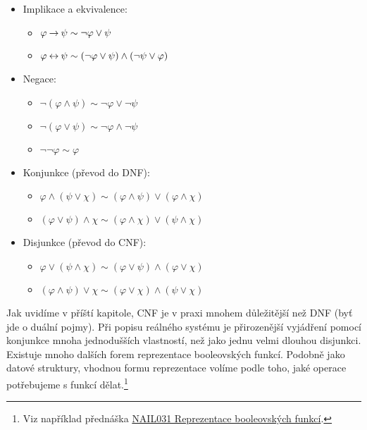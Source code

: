 \begin{tcolorbox}
\begin{multicols}{2}
\begin{itemize}
    \item Implikace a ekvivalence:
    \begin{itemize}
        \item[] $\varphi\mathbin{\rightarrow}\psi\sim\neg\varphi\lor\psi$
        \item[] $\varphi\mathbin{\leftrightarrow}\psi\sim(\neg\varphi\lor\psi)\land(\neg\psi\lor\varphi)$
    \end{itemize}
    \item Negace:
    \begin{itemize}
        \item[] $\neg(\varphi\land\psi)\sim\neg\varphi\lor\neg\psi$
        \item[] $\neg(\varphi\lor\psi)\sim\neg\varphi\land\neg\psi$
        \item[] $\neg\neg\varphi\sim\varphi$
    \end{itemize}
    \item Konjunkce (převod do DNF):
    \begin{itemize}
        \item[] $\varphi \land (\psi\lor\chi) \sim (\varphi\land\psi)\lor (\varphi\land\chi)$
        \item[] $(\varphi \lor \psi)\land\chi \sim (\varphi\land\chi)\lor (\psi\land\chi)$
    \end{itemize}
    \item Disjunkce (převod do CNF):
    \begin{itemize}
        \item[] $\varphi \lor (\psi\land\chi) \sim (\varphi\lor\psi)\land (\varphi\lor\chi)$
        \item[] $(\varphi \land \psi)\lor\chi \sim (\varphi\lor\chi)\land (\psi\lor\chi)$
    \end{itemize}
\end{itemize}
\end{multicols}
\end{tcolorbox}


Jak uvidíme v příští kapitole, CNF je v praxi mnohem důležitější než DNF (byť jde o duální pojmy). Při popisu reálného systému je přirozenější vyjádření pomocí konjunkce mnoha jednodušších vlastností, než jako jednu velmi dlouhou disjunkci. Existuje mnoho dalších forem reprezentace booleovských funkcí. Podobně jako datové struktury, vhodnou formu reprezentace volíme podle toho, jaké operace potřebujeme s funkcí dělat.\footnote{Viz například přednáška \href{https://is.cuni.cz/studium/predmety/index.php?do=predmet&kod=NAIL031}{NAIL031 Reprezentace booleovských funkcí}.}


